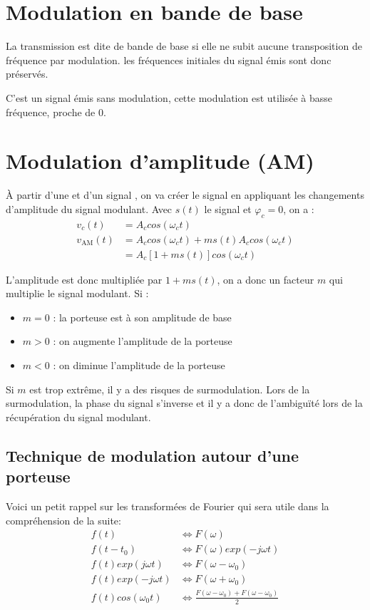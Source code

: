 \section{Modulation en bande de base}

La transmission est dite de bande de base si elle ne subit aucune transposition de fréquence par modulation. les fréquences initiales du signal émis sont donc préservés.

C'est un signal émis sans modulation, cette modulation est utilisée à basse fréquence, proche de 0.

\section{Modulation d'amplitude (AM)}

À partir d'une  et d'un signal , on va créer le signal  en appliquant les changements d'amplitude du signal modulant. Avec $s(t)$ le signal et $\varphi_c = 0$, on a :
\begin{align*}
v_c(t) &= A_c cos(\omega_c t)\\
v_{\text{AM}}(t) &= A_c cos(\omega_c t) + ms(t)A_c cos(\omega_c t)\\
	&= A_c[1 + ms(t)]cos(\omega_c t)
\end{align*}

L'amplitude est donc multipliée par $1+ms(t)$, on a donc un facteur $m$ qui multiplie le signal modulant. Si :
\begin{itemize}
\item $m = 0$ : la porteuse est à son amplitude de base
\item $m > 0$ : on augmente l'amplitude de la porteuse
\item $m < 0$ : on diminue l'amplitude de la porteuse
\end{itemize}
Si $m$ est trop extrême, il y a des risques de surmodulation. Lors de la surmodulation, la phase du signal s'inverse et il y a donc de l’ambiguïté lors de la récupération du signal modulant.

\subsection{Technique de modulation autour d'une porteuse}

Voici un petit rappel sur les transformées de Fourier qui sera utile dans la compréhension de la suite:
\begin{align*}
f(t) &\Leftrightarrow F(\omega)\\
f(t-t_0) &\Leftrightarrow F(\omega)exp(-j\omega t)\\
f(t) exp(j\omega t) &\Leftrightarrow F(\omega-\omega_0)\\
f(t) exp(-j\omega t)&\Leftrightarrow F(\omega+\omega_0)\\
f(t) cos(\omega_0 t) &\Leftrightarrow \frac{F(\omega-\omega_0) +F(\omega-\omega_0)}{2}
\end{align*}

